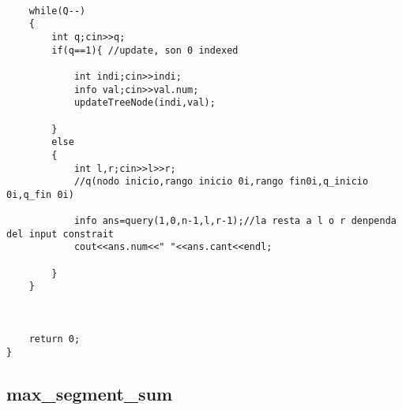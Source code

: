\begin{lstlisting}
    
    while(Q--)
    {
        int q;cin>>q;
        if(q==1){ //update, son 0 indexed

            int indi;cin>>indi;
            info val;cin>>val.num;
            updateTreeNode(indi,val);

        }
        else
        {
            int l,r;cin>>l>>r;
            //q(nodo inicio,rango inicio 0i,rango fin0i,q_inicio 0i,q_fin 0i)

            info ans=query(1,0,n-1,l,r-1);//la resta a l o r denpenda del input constrait
            cout<<ans.num<<" "<<ans.cant<<endl;

        }
    }

    

    return 0;
}\end{lstlisting}

\subsection*{max_segment_sum}
